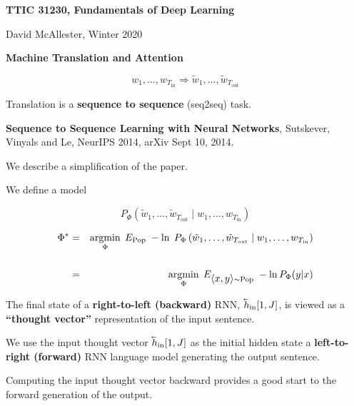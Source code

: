 




{\Huge

  \centerline{\bf TTIC 31230, Fundamentals of Deep Learning}
  \bigskip
  \centerline{David McAllester, Winter 2020}
  \vfill
  \centerline{\bf Machine Translation and Attention}



$$w_1,\ldots,w_{T_{\mathrm{in}}} \Rightarrow \tilde{w}_1,\ldots,\tilde{w}_{T_{\mathrm{out}}}$$

\vfill
Translation is a {\bf sequence to sequence} (seq2seq) task.

\vfill
{\bf Sequence to Sequence Learning with Neural Networks}, Sutskever, Vinyals and Le, NeurIPS 2014, arXiv Sept 10, 2014.

\vfill
We describe a simplification of the paper.




\vfill
We define a model

\vfill
$$P_\Phi\left(\tilde{w}_1,\ldots,\tilde{w}_{T_{\mathrm{out}}}\;|\; w_1,\ldots,w_{T_{\mathrm{in}}}\right)$$

\vfill
\begin{eqnarray*}
\Phi^*  & = & \operatorname*{argmin}_\Phi\; E_{\mathrm{Pop}} \;-\ln\;P_\Phi\left(\tilde{w}_1,\ldots,\tilde{w}_{T_{\mathrm{out}}}\;|\; w_1,\ldots,w_{T_{\mathrm{in}}}\right) \\
\\
& = & \operatorname*{argmin}_\Phi \; E_{{\mbox{$\langle x,y\rangle$}} \sim \mathrm{Pop}} \; -\ln P_\Phi(y|x)
\end{eqnarray*}



\vfill
The final state of a {\bf right-to-left (backward)} RNN, $\cev{h}_{\mathrm{in}}[1,J]$, is viewed as a {\bf ``thought vector''} representation of the input sentence.

\vfill
We use the input thought vector $\cev{h}_{\mathrm{in}}[1,J]$ as the initial hidden state a {\bf left-to-right (forward)} RNN language model
generating the output sentence.

\vfill
Computing the input thought vector backward provides a good start to the forward generation of the output.

}
